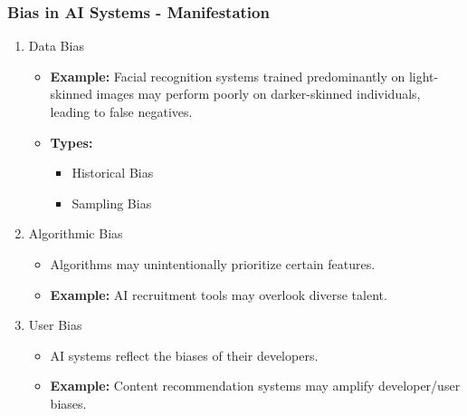 \documentclass[aspectratio=169]{beamer}
\begin{document}
\begin{frame}[fragile]
    \frametitle{Bias in AI Systems - Manifestation}
    \begin{enumerate}
        \item Data Bias
        \begin{itemize}
            \item \textbf{Example:} Facial recognition systems trained predominantly on light-skinned images may perform poorly on darker-skinned individuals, leading to false negatives.
            \item \textbf{Types:}
            \begin{itemize}
                \item Historical Bias
                \item Sampling Bias
            \end{itemize}
        \end{itemize}
        
        \item Algorithmic Bias
        \begin{itemize}
            \item Algorithms may unintentionally prioritize certain features.
            \item \textbf{Example:} AI recruitment tools may overlook diverse talent.
        \end{itemize}

        \item User Bias
        \begin{itemize}
            \item AI systems reflect the biases of their developers.
            \item \textbf{Example:} Content recommendation systems may amplify developer/user biases.
        \end{itemize}
    \end{enumerate}
\end{frame}
\end{document}
